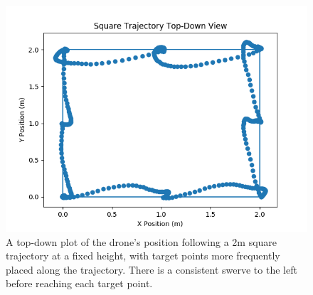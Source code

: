\begin{figure}[H]
    \centering
    \includegraphics[width = 1\textwidth]{img/finer_square.png}
    \caption{A top-down plot of the drone's position following a 2m square trajectory at a fixed height, with target points more frequently placed along the trajectory. There is a consistent swerve to the left before reaching each target point.}
    \label{fig:finer_square}
\end{figure}